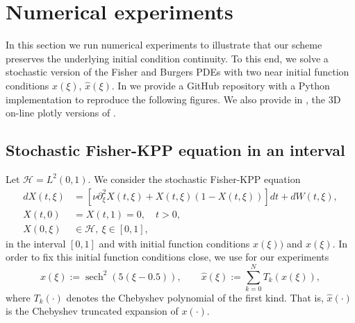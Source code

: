 \documentclass[]{interact}
\theoremstyle{plain}%
\theoremstyle{definition}
\theoremstyle{remark}
\DeclareMathOperator{\sech}{sech}
\begin{document}
\section{Numerical experiments}
    \label{sec:NumericalExperiments}
        In this section we run numerical experiments to illustrate that our
    scheme preserves the underlying initial condition continuity. To 
    this end, we solve  a stochastic version of the  Fisher and Burgers PDEs 
    with two near initial function conditions $x(\xi)$, 
    $\widehat{x}(\xi)$. In \cite{matsumyaRepo} we provide a GitHub repository 
    with a Python implementation to reproduce the following figures. We also 
    provide in \cite{plotlyFisher, plotlyBurgers}, the 3D on-line plotly 
    versions of .
%
    \subsection*{Stochastic Fisher-KPP equation in an interval}
    Let $\mathcal{H} = L^2 (0,1)$. We consider the stochastic
    Fisher-KPP equation 
    \begin{equation}
        \label{eqn:fisher-kpp}
        \begin{aligned}
            d X(t, \xi) &= 
                \left[
                    \nu 
                    \partial_{\xi} ^ 2 X(t, \xi)
                    +
                    X(t, \xi) (1 -X(t, \xi) )
                \right]
                dt
                +
                dW(t, \xi),
            \\
            X(t, 0) &= X(t, 1) =0, \quad t>0, 
            \\
            X(0, \xi) & \in 
            \mathcal{H}, \ \xi \in [0, 1],
        \end{aligned}
    \end{equation}
    in the interval $[0, 1]$ and with initial function 
    conditions
    $x(\xi))$ and  $\widehat{x}(\xi)$. In order to fix this 
    initial function 
    conditions  close, we use for our experiments
    \begin{equation}
        x(\xi) := \sech ^ 2( 5  (\xi - 0.5)),
        \qquad
        \widehat{x}(\xi) :=
            \sum_{k=0} ^ N
             T_k(x(\xi)),
    \end{equation}
    where $T_k(\cdot)$ denotes the Chebyshev polynomial of the first kind. That 
    is, $\widehat{x}(\cdot)$ is the Chebyshev truncated expansion of $x(\cdot)$.
    
\end{document}

